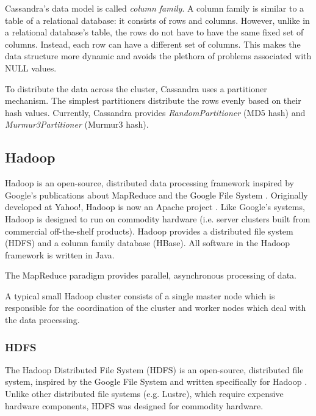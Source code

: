Cassandra's data model is called \emph{column family}. A column family is similar to a table of a relational database: it consists of rows and columns. However, unlike in a relational database's table, the rows do not have to have the same fixed set of columns. Instead, each row can have a different set of columns. This makes the data structure more dynamic and avoids the plethora of problems associated with NULL values.


To distribute the data across the cluster, Cassandra uses a partitioner mechanism. The simplest partitioners distribute the rows evenly based on their hash values. Currently, Cassandra provides \emph{RandomPartitioner} (MD5 hash) and \emph{Murmur3Partitioner} (Murmur3 hash).


\subsection{Hadoop}

Hadoop is an open-source, distributed data processing framework inspired by Google's publications about MapReduce \cite{Dean:2008:MSD:1327452.1327492} and the Google File System \cite{Ghemawat:2003:GFS:945445.945450}. Originally developed at Yahoo!, Hadoop is now an Apache project \cite{Hadoop}. Like Google's systems, Hadoop is designed to run on commodity hardware (i.e. server clusters built from commercial off-the-shelf products). Hadoop provides a distributed file system (HDFS) and a column family database (HBase). All software in the Hadoop framework is written in Java.

The MapReduce paradigm provides parallel, asynchronous processing of data.  

A typical small Hadoop cluster consists of a single master node which is responsible for the coordination of the cluster and worker nodes which deal with the data processing.



\subsubsection{HDFS}

The Hadoop Distributed File System (HDFS) is an open-source, distributed file system, inspired by the Google File System and written specifically for Hadoop \cite{Hadoop}. Unlike other distributed file systems (e.g. Lustre), which require expensive hardware components, HDFS was designed for commodity hardware.


